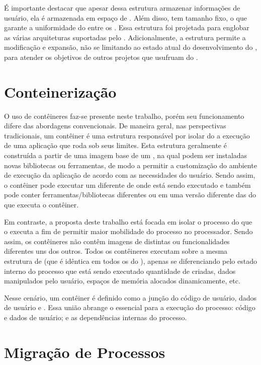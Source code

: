     É importante destacar que apesar dessa estrutura armazenar informações de usuário, ela é armazenada em espaço de . Além disso, tem tamanho fixo, o que garante a uniformidade do  entre os \clusters. Essa estrutura foi projetada para englobar as várias arquiteturas suportadas pelo \nanvix. Adicionalmente, a estrutura permite a modificação e expansão, não se limitando ao estado atual do desenvolvimento do \nanvix, para atender os objetivos de outros projetos que usufruam do \nanvix.

\section{Conteinerização}
O uso de contêineres faz-se presente neste trabalho, porém seu funcionamento difere das abordagens convencionais. De maneira geral, nas perspectivas tradicionais, um contêiner é uma estrutura responsável por isolar do \so a execução de uma aplicação que roda sob seus limites. Esta estrutura geralmente é construída a partir de uma imagem base de um \so, na qual podem ser instaladas novas bibliotecas ou ferramentas, de modo a permitir a customização do ambiente de execução da aplicação de acordo com as necessidades do usuário. Sendo assim, o contêiner pode executar um \so diferente de onde está sendo executado e também pode conter ferramentas/bibliotecas diferentes ou em uma versão diferente das do \so que executa o contêiner.

Em contraste, a proposta deste trabalho está focada em isolar o processo do \cluster que o executa a fim de permitir maior mobilidade do processo no processador. Sendo assim, os contêineres não contêm imagens de \so distintas ou funcionalidades diferentes uns dos outros. Todos os contêineres executam sobre a mesma estrutura de  (que é idêntica em todos os \clusters do \lw), apenas se diferenciando pelo estado interno do processo que está sendo executado \eg quantidade de \threads criadas, dados manipulados pelo usuário, espaços de memória alocados dinamicamente, etc.

Nesse cenário, um contêiner é definido como a junção do código de usuário, dados de usuário e \uarea. Essa união abrange o essencial para a execução do processo: código e dados de usuário; e as dependências internas do processo.

\section{Migração de Processos}
\label{sec.migracao}

